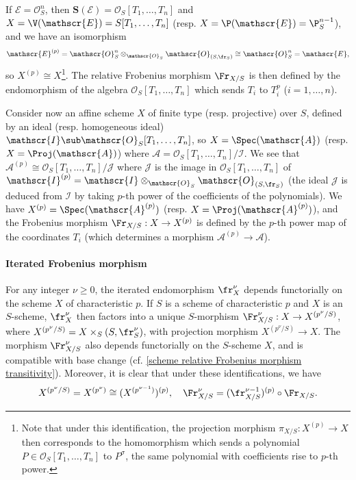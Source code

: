 If $\mathscr{E}=\mathscr{O}_S^n$, then $\bm{S}(\mathscr{E})=\mathscr{O}_S[T_1,\dots,T_n]$ and $X=\V(\mathscr{E})=S[T_1,\dots,T_n]$ (resp. $X=\P(\mathscr{E})=\P_S^{n-1}$), and we have an isomorphism
\[\mathscr{E}^{(p)}=\mathscr{O}_S^n\otimes_{\mathscr{O}_S}\mathscr{O}_{(S,\fr_S)}\cong\mathscr{O}_S^n=\mathscr{E},\]
so $X^{(p)}\cong X$\footnote{Note that under this identification, the projection morphism $\pi_{X/S}:X^{(p)}\to X$ then corresponds to the homomorphism which sends a polynomial $P\in\mathscr{O}_S[T_1,\dots,T_n]$ to $P^{\sigma}$, the same polynomial with coefficients rise to $p$-th power.}. The relative Frobenius morphism $\Fr_{X/S}$ is then defined by the endomorphism of the algebra $\mathscr{O}_S[T_1,\dots,T_n]$ which sends $T_i$ to $T_i^p$ ($i=1,\dots,n$).\par
Consider now an affine scheme $X$ of finite type (resp. projective) over $S$, defined by an ideal (resp. homogeneous ideal) $\mathscr{I}\sub\mathscr{O}_S[T_1,\dots,T_n]$, so $X=\Spec(\mathscr{A})$ (resp. $X=\Proj(\mathscr{A})$) where $\mathscr{A}=\mathscr{O}_S[T_1,\dots,T_n]/\mathscr{I}$. We see that $\mathscr{A}^{(p)}\cong\mathscr{O}_S[T_1,\dots,T_n]/\mathscr{J}$ where $\mathscr{J}$ is the image in $\mathscr{O}_S[T_1,\dots,T_n]$ of $\mathscr{I}^{(p)}=\mathscr{I}\otimes_{\mathscr{O}_S}\mathscr{O}_{(S,\fr_S)}$ (the ideal $\mathscr{J}$ is deduced from $\mathscr{I}$ by taking $p$-th power of the coefficients of the polynomials). We have $X^{(p)}=\Spec(\mathscr{A}^{(p)})$ (resp. $X=\Proj(\mathscr{A}^{(p)})$), and the Frobenius morphism $\Fr_{X/S}:X\to X^{(p)}$ is defined by the $p$-th power map of the coordinates $T_i$ (which determines a morphism $\mathscr{A}^{(p)}\to\mathscr{A}$).

\paragraph{Iterated Frobenius morphism}
For any integer $\nu\geq 0$, the iterated endomorphism $\fr_X^\nu$ depends functorially on the scheme $X$ of characteristic $p$. If $S$ is a scheme of characteristic $p$ and $X$ is an $S$-scheme, $\fr_X^\nu$ then factors into a unique $S$-morphism $\Fr_{X/S}^\nu:X\to X^{(p^\nu/S)}$, where $X^{(p^\nu/S)}=X\times_S(S,\fr_S^\nu)$, with projection morphism $X^{(p^\nu/S)}\to X$. The morphism $\Fr_{X/S}^\nu$ also depends functorially on the $S$-scheme $X$, and is compatible with base change (cf. \cref{scheme relative Frobenius morphism transitivity}). Moreover, it is clear that under these identifications, we have
\begin{equation}\label{scheme iterated Frobenius morphism equality}
X^{(p^\nu/S)}=X^{(p^\nu)}\cong (X^{(p^{\nu-1})})^{(p)},\quad \Fr_{X/S}^\nu=(\fr_{X/S}^{\nu-1})^{(p)}\circ\Fr_{X/S}.
\end{equation}

